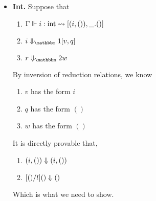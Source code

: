 \documentclass{article}
\begin{document}
\begin{itemize}
\item {\bf Int.} Suppose that
\begin{enumerate}
\item ${\Gamma} \Vdash {i}:{\rm int} \rightsquigarrow \left[{(i,()),\_.()}\right]$
\item $\rsone{i}{v}{q}$
\item $\reducetwo{r}{w}$
\end{enumerate}
By inversion of reduction relations, we know
\begin{enumerate}
\item $v$ has the form $i$
\item $q$ has the form $()$
\item $w$ has the form $()$
\end{enumerate}
It is directly provable that,
\begin{enumerate}
\item ${(i,())} \Downarrow {({i},{()})}$
\item ${[()/l]()} \Downarrow {()}$
\end{enumerate}
Which is what we need to show.


\end{itemize}
\end{document}
